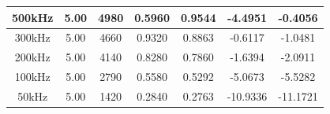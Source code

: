 \documentclass{article}
\begin{document}
\begin{table}[H]
\begin{tabular}{|c|c|c|c|c|c|c|}
		500kHz    & 5.00                                                                    & 4980                                                                           & 0.5960                                                                  & 0.9544                                                                             & -4.4951                                                                         & -0.4056                                                                                    \\ \hline
		300kHz    & 5.00                                                                    & 4660                                                                           & 0.9320                                                                  & 0.8863                                                                             & -0.6117                                                                         & -1.0481                                                                                    \\ \hline
		200kHz    & 5.00                                                                    & 4140                                                                           & 0.8280                                                                  & 0.7860                                                                             & -1.6394                                                                         & -2.0911                                                                                    \\ \hline
		100kHz    & 5.00                                                                    & 2790                                                                           & 0.5580                                                                  & 0.5292                                                                             & -5.0673                                                                         & -5.5282                                                                                    \\ \hline
		50kHz     & 5.00                                                                    & 1420                                                                           & 0.2840                                                                  & 0.2763                                                                             & -10.9336                                                                        & -11.1721                                                                                   \\ \hline

\end{tabular}
\end{table}
\end{document}
